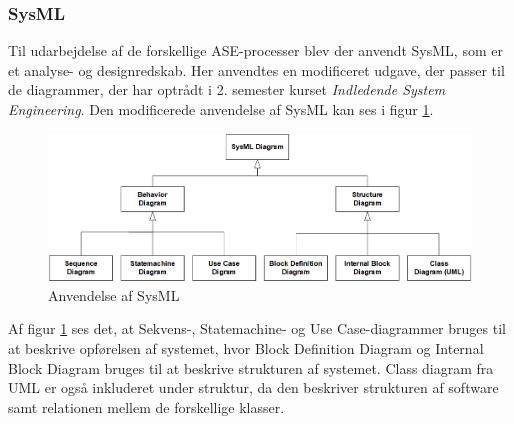 \documentclass[a4paper,12pt,fleqn,oneside]{article}
\begin{document}
\subsubsection{SysML}
Til udarbejdelse af de forskellige ASE-processer blev der anvendt SysML, som er et analyse- og designredskab. Her anvendtes en modificeret udgave, der passer til de diagrammer, der har optrådt i 2. semester kurset \textit{Indledende System Engineering}. Den modificerede anvendelse af SysML kan ses i figur \ref{fig:Sysml_usage}.
\begin{figure}[H]
    \centering
    \includegraphics[width=\textwidth]{ProcesDokument/graphics/Sysml_usage.png}
    \caption{Anvendelse af SysML}
    \label{fig:Sysml_usage}
\end{figure}
Af figur \ref{fig:Sysml_usage} ses det, at Sekvens-, Statemachine- og Use Case-diagrammer bruges til at beskrive opførelsen af systemet, hvor Block Definition Diagram og Internal Block Diagram bruges til at beskrive strukturen af systemet. Class diagram fra UML er også inkluderet under struktur, da den beskriver strukturen af software samt relationen mellem de forskellige klasser. 
\end{document}
